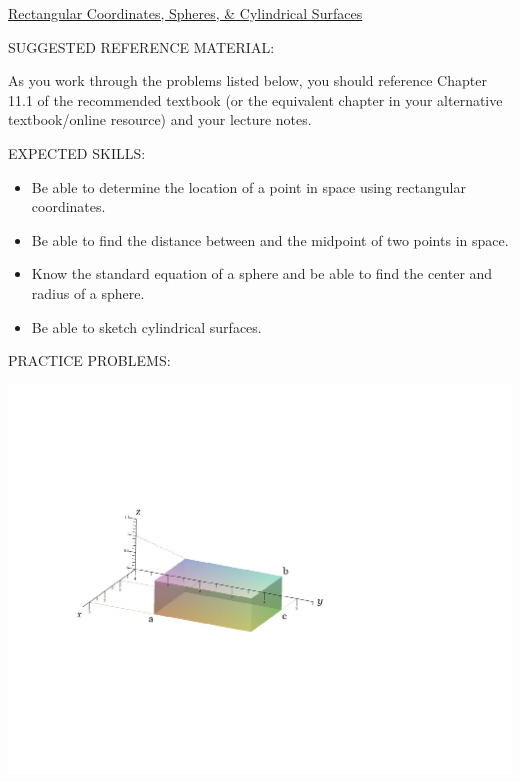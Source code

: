\documentclass[12pt]{article}
\begin{document}
\begin{center}
\underline{\LARGE{Rectangular Coordinates, Spheres, \& Cylindrical Surfaces}}
\end{center}

\noindent SUGGESTED REFERENCE MATERIAL:

\bigskip

\noindent As you work through the problems listed below, you should reference Chapter 11.1 of the recommended textbook (or the equivalent chapter in your alternative textbook/online resource) and your lecture notes.

\bigskip

\noindent EXPECTED SKILLS:

\begin{itemize}

\item Be able to determine the location of a point in space using rectangular coordinates.

\item Be able to find the distance between and the midpoint of two points in space.

\item Know the standard equation of a sphere and be able to find the center and radius of a sphere. 

\item Be able to sketch cylindrical surfaces.

\end{itemize}

\noindent PRACTICE PROBLEMS:

\medskip


\begin{center}
\includegraphics[scale=0.7]{box.pdf}
\end{center}
\end{document}
